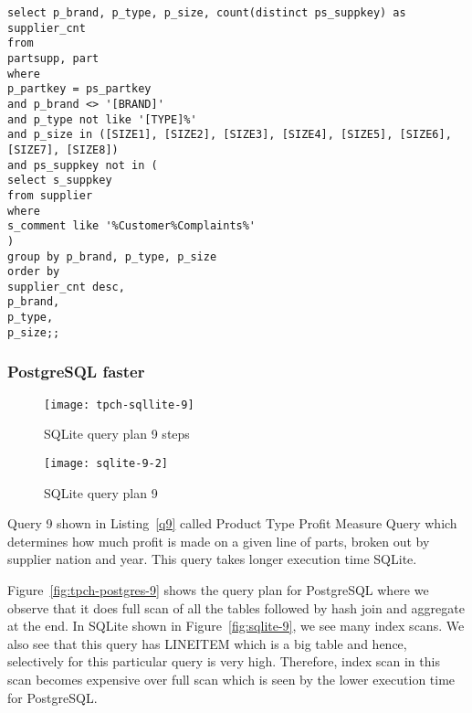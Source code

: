 \begin{minipage}{\linewidth}
\begin{lstlisting}[breaklines=true, numbers=none, label=q16, caption=Query 16]
select p_brand, p_type, p_size, count(distinct ps_suppkey) as supplier_cnt
from
partsupp, part
where
p_partkey = ps_partkey
and p_brand <> '[BRAND]'
and p_type not like '[TYPE]%'
and p_size in ([SIZE1], [SIZE2], [SIZE3], [SIZE4], [SIZE5], [SIZE6], [SIZE7], [SIZE8])
and ps_suppkey not in (
select s_suppkey
from supplier
where
s_comment like '%Customer%Complaints%'
)
group by p_brand, p_type, p_size
order by
supplier_cnt desc,
p_brand,
p_type,
p_size;;
\end{lstlisting}
\end{minipage}






\subsubsection{PostgreSQL faster}

\begin{figure*}[ht]
\centering
     \begin{subfigure}[b]{0.4\textwidth}
         \centering
         \texttt{[image: tpch-sqllite-9]}
         \caption{SQLite query plan 9 steps}
         \label{fig:tpch-sqllite-9}
     \end{subfigure}
     \hfill
     \begin{subfigure}[b]{0.4\textwidth}
         \centering
         \texttt{[image: sqlite-9-2]}
         \caption{SQLite query plan 9}
         \label{fig:sqlite-9-2}
     \end{subfigure}

        \caption{SQLite plan for query 9}
        \label{fig:sqlite-9}
\end{figure*}
Query 9 shown in Listing~\ref{q9} called Product Type Profit Measure Query which determines how much profit is made on a given line of parts, broken out by supplier nation and year. This query takes longer execution time SQLite.

Figure~\ref{fig:tpch-postgres-9} shows the query plan for PostgreSQL where we observe that it does full scan of all the tables followed by hash join and aggregate at the end. In SQLite shown in Figure~\ref{fig:sqlite-9}, we see many index scans. We also see that this query has LINEITEM which is a big table and hence, selectively for this particular query is very high. Therefore, index scan in this scan becomes expensive over full scan which is seen by the lower execution time for PostgreSQL.

